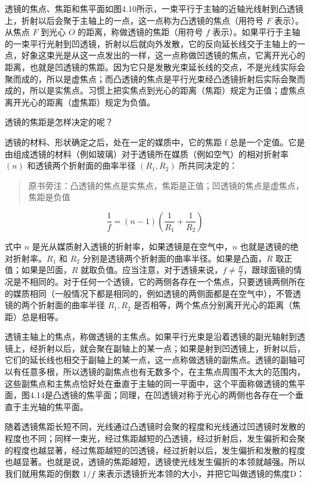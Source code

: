 透镜的焦点、焦距和焦平面如图4.10所示，一束平行于主轴的近轴光线射到凸透镜上，折射以后会聚于主轴上的一点，这一点称为凸透镜的焦点（用符号
\(F\) 表示）。从焦点 \(F\) 到光心 \(O\) 的距离，称做透镜的焦距（用符号
\(f\)
表示）。如果平行于主轴的一束平行光射到凹透镜，折射以后就向外发散，它的反向延长线交于主轴上的一点，好象这束光是从这一点发出的一样，这一点称做凹透镜的焦点，它离开光心的距离，也就是凹透镜的焦距。因为它只是发散光束延长线的交点，不是光线实际会聚而成的，所以是虚焦点；而凸透镜的焦点是平行光束经凸透镜折射后实际会聚而成的，所以是实焦点。习惯上把实焦点到光心的距离（焦距）规定为正值；虚焦点离开光心的距离（虚焦距）规定为负值。

透镜的焦距是怎样决定的呢？

透镜的材料、形状确定之后，处在一定的媒质中，它的焦距 f
总是一个定值。它是由组成透镜的材料（例如玻璃）对于透镜所在媒质（例如空气）的相对折射率
\((n)\) 和透镜两个折射面的曲率半径 \((R_{1}, R_{2})\) 所共同决定的：

\begin{quote}
原书旁注：凸透镜的焦点是实焦点，焦距是正值；凹透镜的焦点是虚焦点，焦距是负值
\end{quote}

\[
\frac {1}{f} = (n - 1) \left(\frac {1}{R _ {1}} + \frac {1}{R _ {2}}\right)
\]

式中 \(n\) 是光从媒质射入透镜的折射率，如果透镜是在空气中，\(n\)
也就是透镜的绝对折射率。\(R_{1}\) 和 \(R_{2}\)
分别是透镜两个折射面的曲率半径。如果是凸面，\(R\)
取正值；如果是凹面，\(R\)
就取负值。应当注意，对于透镜来说，\(f \neq \frac{R}{2}\)，跟球面镜的情况是不相同的。对于任何一个透镜，它的两侧各存在一个焦点，只要透镜两侧所在的媒质相同（一般情况下都是相同的，例如透镜的两侧面都是在空气中），不管透镜的两个折射面的曲率半径
\(R_{1}, R_{2}\) 是否相等，两个焦点分别离开光心的距离（焦距）总是相等。

透镜主轴上的焦点，称做透镜的主焦点。如果平行光束是沿着透镜的副光轴射到透镜上，经折射以后，就会聚在副轴上的某一点；如果是射到凹透镜上，折射以后，它们的延长线也相交于副轴上的某一点，这一点称做透镜的副焦点。透镜的副轴可以有任意多根，所以透镜的副焦点也有无数多个，在主焦点周围不太大的范围内，这些副焦点和主焦点恰好处在垂直于主轴的同一平面中，这个平面称做透镜的焦平面，图4.14是凸透镜的焦平面；同理，在凹透镜对称于光心的两侧也各存在一个垂直于主光轴的焦平面。

随着透镜焦距长短不同，光线通过凸透镜时会聚的程度和光线通过凹透镜时发散的程度也不同；同样一束光，经过焦距越短的凸透镜，经过折射后，发生偏折和会聚的程度也越显著，经过焦距越短的凹透镜，经过折射以后，发生偏折和发散的程度也越显著。也就是说，透镜的焦距越短，透镜使光线发生偏折的本领就越强。所以我们就用焦距的倒数
\(1 / f\) 来表示透镜折光本领的大小，并把它叫做透镜的焦度D：


